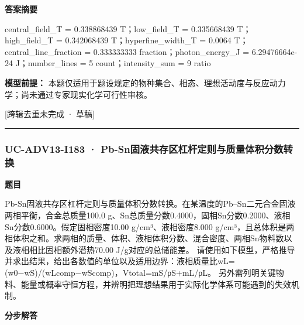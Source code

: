 \documentclass[UTF8,11pt,a4paper]{ctexart}
\begin{document}
\noindent\textbf{答案摘要}\par
central\_field\_T = 0.338868439 T；low\_field\_T = 0.335668439 T；high\_field\_T = 0.342068439 T；hyperfine\_width\_T = 0.0064 T；central\_line\_fraction = 0.333333333 fraction；photon\_energy\_J = 6.29476664e-24 J；number\_lines = 5 count；intensity\_sum = 9 ratio\par
\noindent\textbf{模型前提：}
本题仅适用于题设规定的物种集合、相态、理想活动度与反应动力学；尚未通过专家现实化学可行性审核。\par
\noindent\textcolor{red!65!black}{[跨辑去重未完成 · 草稿]} \par
\medskip\hrule\medskip
{}
\subsubsection*{UC-ADV13-I183 · Pb-Sn固液共存区杠杆定则与质量体积分数转换}
\noindent\textbf{题目}\par
Pb-Sn固液共存区杠杆定则与质量体积分数转换。在某温度的Pb–Sn二元合金固液两相平衡，合金总质量100.0 g、Sn总质量分数0.4000，固相Sn分数0.2000、液相Sn分数0.6000。假定固相密度10.00 g/cm³、液相密度8.000 g/cm³，且总体积是两相体积之和。求两相的质量、体积、液相体积分数、混合密度、两相Sn物料数以及液相相比固相额外潜热70.00 J/g对应的总储能差。 请使用如下模型，严格推导并求出结果，给出各数值的单位以及适用边界：液相质量比wL=(w0−wS)/(wLcomp−wScomp)，Vtotal=mS/ρS+mL/ρL。 另外需列明关键物料、能量或概率守恒方程，并辨明把理想结果用于实际化学体系可能遇到的失效机制。\par
\medskip\noindent\textbf{分步解答}
\end{document}
